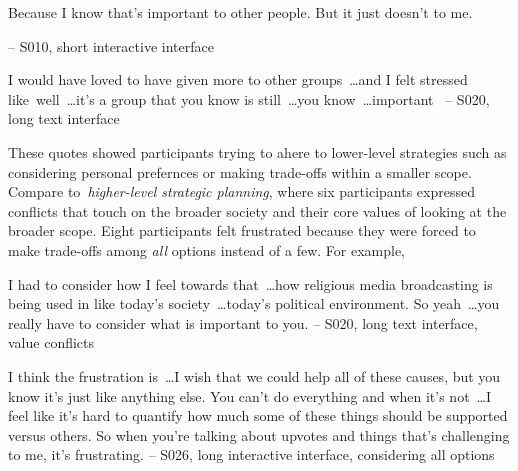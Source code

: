 \begin{displayquote}
Because I know that's important to other people. But it just doesn't to me.
    
\noindent \hfill -- S010, short interactive interface
\end{displayquote}

\begin{displayquote}
I would have loved to have given more to other groups~\ldots and I felt stressed like~\bracketellipsis well~\ldots it's a group that you know is still~\ldots you know~\ldots important~\bracketellipsis
\noindent \hfill -- S020, long text interface
\end{displayquote}

These quotes showed participants trying to ahere to lower-level strategies such as considering personal prefernces or making trade-offs within a smaller scope. Compare to~\textit{higher-level strategic planning}, where six participants expressed conflicts that touch on the broader society and their core values of looking at the broader scope. Eight participants felt frustrated because they were forced to make trade-offs among \textit{all} options instead of a few. For example,

\begin{displayquote}
I had to consider how I feel towards that~\ldots how religious media broadcasting is being used in like today's society~\ldots today's political environment. So yeah~\ldots you really have to consider what is important to you. 
\noindent \hfill -- S020, long text interface, value conflicts
\end{displayquote}

\begin{displayquote}
I think the frustration is~\ldots I wish that we could help all of these causes, but you know it's just like anything else. You can't do everything and when it's not~\ldots  I feel like it's hard to quantify how much some of these things should be supported versus others. So when you're talking about upvotes and things that's challenging to me, it's frustrating.
\noindent \hfill -- S026, long interactive interface, considering all options
\end{displayquote}

